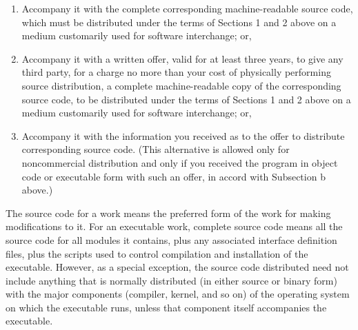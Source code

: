 \begin{enumerate}
\begin{enumerate}
\item Accompany it with the complete corresponding machine-readable
    source code, which must be distributed under the terms of Sections
    1 and 2 above on a medium customarily used for software interchange; or,
\item Accompany it with a written offer, valid for at least three
    years, to give any third party, for a charge no more than your
    cost of physically performing source distribution, a complete
    machine-readable copy of the corresponding source code, to be
    distributed under the terms of Sections 1 and 2 above on a medium
    customarily used for software interchange; or,
\item Accompany it with the information you received as to the offer
    to distribute corresponding source code.  (This alternative is
    allowed only for noncommercial distribution and only if you
    received the program in object code or executable form with such
    an offer, in accord with Subsection b above.)
\end{enumerate}

The source code for a work means the preferred form of the work for
making modifications to it.  For an executable work, complete source
code means all the source code for all modules it contains, plus any
associated interface definition files, plus the scripts used to
control compilation and installation of the executable.  However, as a
special exception, the source code distributed need not include
anything that is normally distributed (in either source or binary
form) with the major components (compiler, kernel, and so on) of the
operating system on which the executable runs, unless that component
itself accompanies the executable.


\end{enumerate}
